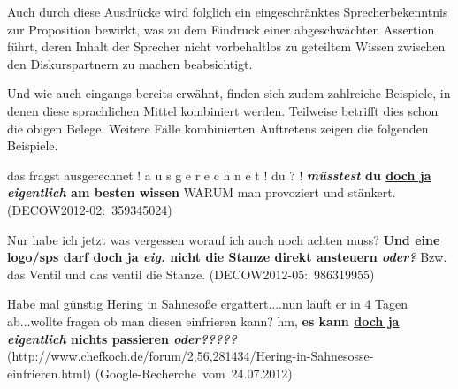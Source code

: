 Auch durch diese Ausdrücke wird folglich ein eingeschränktes Sprecherbekennt\-nis zur Proposition bewirkt, was zu dem Eindruck einer abgeschwächten Assertion führt, deren Inhalt der Sprecher nicht vorbehaltlos zu geteiltem Wissen zwischen den Diskurspartnern zu machen beabsichtigt.

Und wie auch eingangs bereits erwähnt, finden sich zudem zahlreiche Beispiele, in denen diese sprachlichen Mittel kombiniert werden. Teilweise betrifft dies schon die obigen Belege. Weitere Fälle kombinierten Auftretens zeigen die folgenden Beispiele.

\begin{exe}
	\ex\label{502} 
	\scriptsize
	das fragst ausgerechnet ! a u s g e r e c h n e t ! du ? ! \textbf{\textit{müsstest} du \underline{doch ja} \textit{eigentlich} am besten wissen} 			WARUM man provoziert und stänkert.		 		 
	\hfill\hbox{(DECOW2012-02: 359345024)}	
\end{exe}

\begin{exe}
	\ex\label{503} 
	\scriptsize
	Nur habe ich jetzt was vergessen worauf ich auch noch achten muss? \textbf{Und eine logo/sps darf \underline{doch ja} \textit{eig.} nicht die Stanze 		direkt ansteuern \textit{oder?}} Bzw. das Ventil und das ventil die Stanze.		 		 
	\newline
	\hbox{}\hfill\hbox{(DECOW2012-05: 986319955)}	
\end{exe}
			              
\begin{exe}
	\ex\label{504} 
	\scriptsize
	Habe mal günstig Hering in Sahnesoße ergattert....nun läuft er in 4 Tagen ab...wollte fragen ob man diesen einfrieren kann?
	hm, \textbf{es kann \underline{doch ja} \textit{eigentlich} nichts passieren \textit{oder?????}} 
	\newline
	\hbox{}\hfill\hbox {(http://www.chefkoch.de/forum/2,56,281434/Hering-in-Sahnesosse-einfrieren.html)}
	\newline
	\hbox{}\hfill\hbox {(Google-Recherche vom 24.07.2012)}
\end{exe}	

